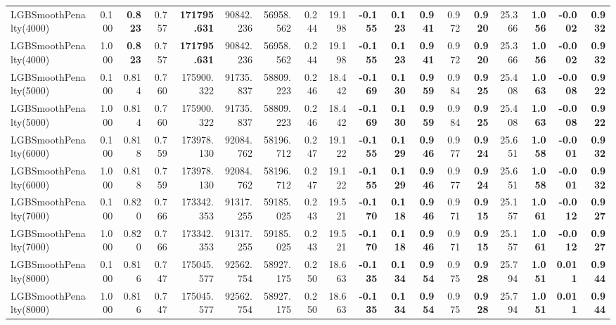 \documentclass[11pt]{article}
\theoremstyle{plain}
\theoremstyle{definition}
\newcommand{\1}{\mathbf{1}}
\begin{document}
\begin{table}[htbp]
{\begin{tabular}{lrrrrrrrrrrrrrrrrr}
LGBSmoothPenalty(4000) & 0.100 & \textbf{0.823} & 0.757 & \textbf{171795.631} & 90842.236 & 56958.562 & 0.244 & 19.198 & \textbf{-0.155} & \textbf{0.123} & \textbf{0.941} & 0.972 & \textbf{0.920} & 25.366 & \textbf{1.056} & \textbf{-0.002} & \textbf{0.932} \\
LGBSmoothPenalty(4000) & 1.000 & \textbf{0.823} & 0.757 & \textbf{171795.631} & 90842.236 & 56958.562 & 0.244 & 19.198 & \textbf{-0.155} & \textbf{0.123} & \textbf{0.941} & 0.972 & \textbf{0.920} & 25.366 & \textbf{1.056} & \textbf{-0.002} & \textbf{0.932} \\
LGBSmoothPenalty(5000) & 0.100 & 0.814 & 0.760 & 175900.322 & 91735.837 & 58809.223 & 0.246 & 18.442 & \textbf{-0.169} & \textbf{0.130} & \textbf{0.959} & 0.984 & \textbf{0.925} & 25.408 & \textbf{1.063} & \textbf{-0.008} & \textbf{0.922} \\
LGBSmoothPenalty(5000) & 1.000 & 0.814 & 0.760 & 175900.322 & 91735.837 & 58809.223 & 0.246 & 18.442 & \textbf{-0.169} & \textbf{0.130} & \textbf{0.959} & 0.984 & \textbf{0.925} & 25.408 & \textbf{1.063} & \textbf{-0.008} & \textbf{0.922} \\
LGBSmoothPenalty(6000) & 0.100 & 0.818 & 0.759 & 173978.130 & 92084.762 & 58196.712 & 0.247 & 19.122 & \textbf{-0.155} & \textbf{0.129} & \textbf{0.946} & 0.977 & \textbf{0.924} & 25.651 & \textbf{1.058} & \textbf{-0.001} & \textbf{0.932} \\
LGBSmoothPenalty(6000) & 1.000 & 0.818 & 0.759 & 173978.130 & 92084.762 & 58196.712 & 0.247 & 19.122 & \textbf{-0.155} & \textbf{0.129} & \textbf{0.946} & 0.977 & \textbf{0.924} & 25.651 & \textbf{1.058} & \textbf{-0.001} & \textbf{0.932} \\
LGBSmoothPenalty(7000) & 0.100 & 0.820 & 0.766 & 173342.353 & 91317.255 & 59185.025 & 0.243 & 19.521 & \textbf{-0.170} & \textbf{0.118} & \textbf{0.946} & 0.971 & \textbf{0.915} & 25.157 & \textbf{1.061} & \textbf{-0.012} & \textbf{0.927} \\
LGBSmoothPenalty(7000) & 1.000 & 0.820 & 0.766 & 173342.353 & 91317.255 & 59185.025 & 0.243 & 19.521 & \textbf{-0.170} & \textbf{0.118} & \textbf{0.946} & 0.971 & \textbf{0.915} & 25.157 & \textbf{1.061} & \textbf{-0.012} & \textbf{0.927} \\
LGBSmoothPenalty(8000) & 0.100 & 0.816 & 0.747 & 175045.577 & 92562.754 & 58927.175 & 0.250 & 18.663 & \textbf{-0.135} & \textbf{0.134} & \textbf{0.954} & 0.975 & \textbf{0.928} & 25.794 & \textbf{1.051} & \textbf{0.011} & \textbf{0.944} \\
LGBSmoothPenalty(8000) & 1.000 & 0.816 & 0.747 & 175045.577 & 92562.754 & 58927.175 & 0.250 & 18.663 & \textbf{-0.135} & \textbf{0.134} & \textbf{0.954} & 0.975 & \textbf{0.928} & 25.794 & \textbf{1.051} & \textbf{0.011} & \textbf{0.944} \\

\end{tabular}}
\end{table}
\end{document}

